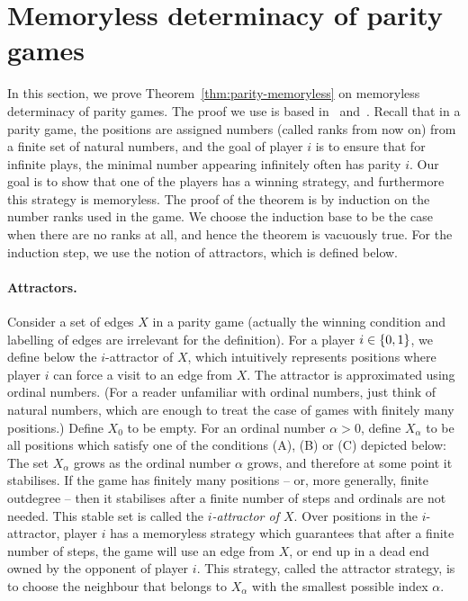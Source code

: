 \section{Memoryless determinacy of parity games}
\label{sec:memoryless-determinacy}
In this section, we prove 
Theorem~\ref{thm:parity-memoryless} on memoryless determinacy of parity games. The proof we use is based in~\cite{Zielonka:1998dw} and~\cite{Thomas:1997ec}.
 Recall that in a parity game,
 the positions are assigned numbers (called ranks from now on) from a finite set of natural numbers, and the goal of player $i$ is to ensure that for infinite plays, the minimal number appearing infinitely often has parity $i$. Our goal is to show that one of the players has a winning strategy, and furthermore this strategy is memoryless. The proof of the theorem is by induction on the number ranks used in the game. We choose the induction base to be the case when there are no ranks at all, and hence the theorem is vacuously true. For the induction step, we use the notion of attractors, which is defined below.





\paragraph*{Attractors.}
Consider a set of edges $X$ in a parity game (actually the winning condition and labelling of edges are irrelevant for the definition). For a player $i \in \{0,1\}$, we define below the $i$-attractor of $X$, which intuitively represents positions where player $i$ can force a visit to an edge from $X$. The attractor is approximated using ordinal numbers. (For a reader unfamiliar with ordinal numbers, just think of natural numbers, which are enough to treat the case of games with finitely many positions.) Define $X_0$ to be empty. For  an ordinal number $\alpha >0$, define $X_\alpha$ to be all positions which satisfy one of the conditions (A), (B) or (C) depicted below:
The set $X_\alpha$ grows as the ordinal number $\alpha$ grows, and therefore at some point it stabilises. If the game has finitely many positions -- or, more generally, finite outdegree -- then it stabilises after a finite number of steps and ordinals are not needed.
This stable set is called the \emph{$i$-attractor of $X$}. Over positions in the $i$-attractor, player $i$ has a memoryless strategy which guarantees that after a finite number of steps, the game will use  an edge from $X$, or end up in a dead end owned by the opponent of player $i$. This strategy, called the attractor strategy,  is to choose the neighbour that belongs to  $X_\alpha$ with the smallest possible index $\alpha$.



